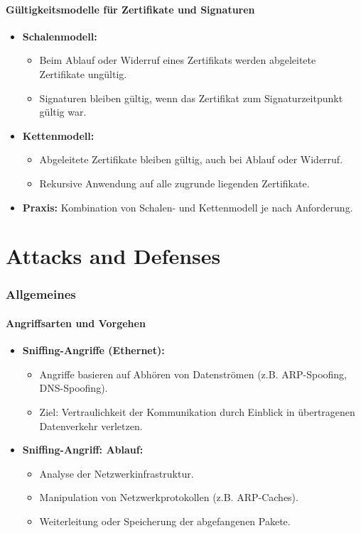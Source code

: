 \documentclass{article}
\begin{document}
\subsection{Gültigkeitsmodelle für Zertifikate und Signaturen}
\begin{itemize}
    \item \textbf{Schalenmodell:}
    \begin{itemize}
        \item Beim Ablauf oder Widerruf eines Zertifikats werden abgeleitete Zertifikate ungültig.
        \item Signaturen bleiben gültig, wenn das Zertifikat zum Signaturzeitpunkt gültig war.
    \end{itemize}
    \item \textbf{Kettenmodell:}
    \begin{itemize}
        \item Abgeleitete Zertifikate bleiben gültig, auch bei Ablauf oder Widerruf.
        \item Rekursive Anwendung auf alle zugrunde liegenden Zertifikate.
    \end{itemize}
    \item \textbf{Praxis:} Kombination von Schalen- und Kettenmodell je nach Anforderung.
\end{itemize}





\part{Attacks and Defenses}
\section{Allgemeines}

\subsection{Angriffsarten und Vorgehen}
\begin{itemize}
    \item \textbf{Sniffing-Angriffe (Ethernet):}
    \begin{itemize}
        \item Angriffe basieren auf Abhören von Datenströmen (z.B. ARP-Spoofing, DNS-Spoofing).
        \item Ziel: Vertraulichkeit der Kommunikation durch Einblick in übertragenen Datenverkehr verletzen.
    \end{itemize}
    \item \textbf{Sniffing-Angriff: Ablauf:}
    \begin{itemize}
        \item Analyse der Netzwerkinfrastruktur.
        \item Manipulation von Netzwerkprotokollen (z.B. ARP-Caches).
        \item Weiterleitung oder Speicherung der abgefangenen Pakete.
    \end{itemize}
\end{itemize}
\end{document}
